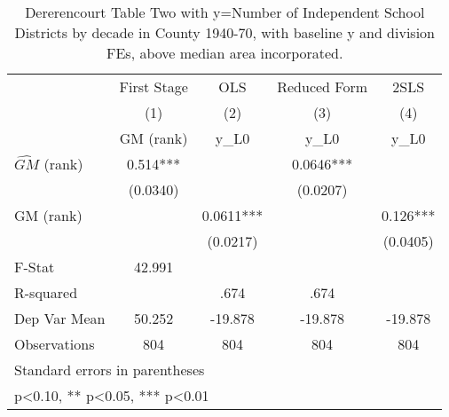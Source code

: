 \begin{table}[htbp]\centering
\def\sym#1{\ifmmode^{#1}\else\(^{#1}\)\fi}
\caption{Dererencourt Table Two with y=Number of Independent School Districts by decade in County 1940-70, with baseline y and division FEs, above median area incorporated.}
\begin{tabular}{l*{4}{c}}
\toprule
                    & First Stage   &         OLS   &Reduced Form   &        2SLS   \\
                    &\multicolumn{1}{c}{(1)}&\multicolumn{1}{c}{(2)}&\multicolumn{1}{c}{(3)}&\multicolumn{1}{c}{(4)}\\
                    &\multicolumn{1}{c}{GM  (rank)}&\multicolumn{1}{c}{y\_L0}&\multicolumn{1}{c}{y\_L0}&\multicolumn{1}{c}{y\_L0}\\
\midrule
$\hat{GM}$ (rank)   &       0.514***&               &      0.0646***&               \\
                    &    (0.0340)   &               &    (0.0207)   &               \\
\addlinespace
GM  (rank)          &               &      0.0611***&               &       0.126***\\
                    &               &    (0.0217)   &               &    (0.0405)   \\
\midrule
F-Stat              &      42.991   &               &               &               \\
R-squared           &               &        .674   &        .674   &               \\
Dep Var Mean        &      50.252   &     -19.878   &     -19.878   &     -19.878   \\
Observations        &         804   &         804   &         804   &         804   \\
\bottomrule
\multicolumn{5}{l}{\footnotesize Standard errors in parentheses}\\
\multicolumn{5}{l}{\footnotesize * p<0.10, ** p<0.05, *** p<0.01}\\
\end{tabular}
\end{table}
